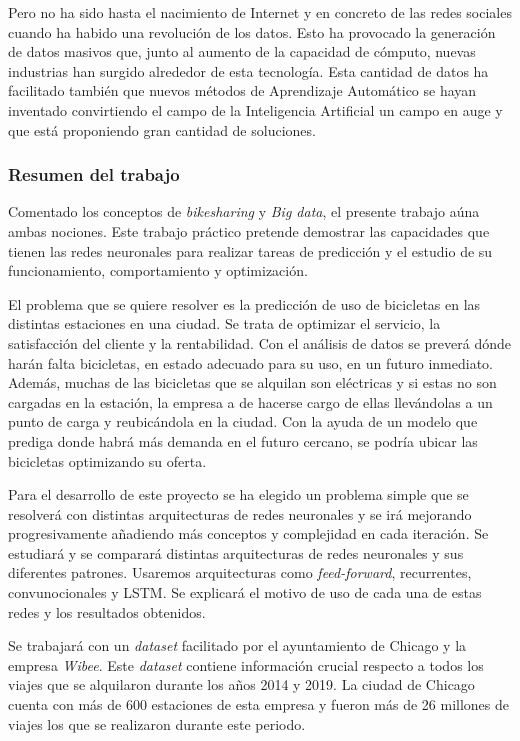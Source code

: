 Pero no ha sido hasta el nacimiento de Internet y en concreto de las redes sociales cuando ha habido una revolución de los datos. Esto ha provocado la generación de datos masivos que, junto al aumento de la capacidad de cómputo, nuevas industrias han surgido alrededor de esta tecnología. Esta cantidad de datos ha facilitado también que nuevos métodos de Aprendizaje Automático se hayan inventado convirtiendo el campo de la Inteligencia Artificial un campo en auge y que está proponiendo gran cantidad de soluciones.
\newline

\subsubsection{Resumen del trabajo}
Comentado los conceptos de \textit{bikesharing} y \textit{Big data}, el presente trabajo aúna ambas nociones. Este trabajo práctico pretende demostrar las capacidades que tienen las redes neuronales para realizar tareas de predicción y el estudio de su funcionamiento, comportamiento y optimización.
\newline

El problema que se quiere resolver es la predicción de uso de bicicletas en las distintas estaciones en una ciudad. Se trata de optimizar el servicio, la satisfacción del cliente y la rentabilidad. Con el análisis de datos se preverá dónde harán falta bicicletas, en estado adecuado para su uso, en un futuro inmediato. Además, muchas de las bicicletas que se alquilan son eléctricas y si estas no son cargadas en la estación, la empresa a de hacerse cargo de ellas llevándolas a un punto de carga y reubicándola en la ciudad. Con la ayuda de un modelo que prediga donde habrá más demanda en el futuro cercano, se podría ubicar las bicicletas optimizando su oferta.
\newline

Para el desarrollo de este proyecto se ha elegido un problema simple que se resolverá con distintas arquitecturas de redes neuronales y se irá mejorando progresivamente añadiendo más conceptos y complejidad en cada iteración. Se estudiará y se comparará distintas arquitecturas de redes neuronales y sus diferentes patrones. Usaremos arquitecturas como \textit{feed-forward}, recurrentes, convunocionales y LSTM. Se explicará el motivo de uso de cada una de estas redes y los resultados obtenidos.
\newline

Se trabajará con un \textit{dataset} facilitado por el ayuntamiento de Chicago y la empresa \textit{Wibee}. Este \textit{dataset} contiene información crucial respecto a todos los viajes que se alquilaron durante los años 2014 y 2019. La ciudad de Chicago cuenta con más de 600 estaciones de esta empresa y fueron más de 26 millones de viajes los que se realizaron durante este periodo.
\newline


